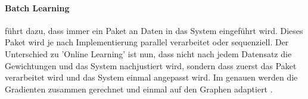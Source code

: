\paragraph{Batch Learning} %
führt dazu, dass immer ein Paket an Daten in das System eingeführt wird. 
Dieses Paket wird je nach Implementierung parallel verarbeitet oder sequenziell. 
Der Unterschied zu 'Online Learning' ist nun, dass nicht nach jedem Datensatz die Gewichtungen und das System nachjustiert wird, sondern dass zuerst das Paket verarbeitet wird und das System einmal angepasst wird. 
Im genauen werden die Gradienten zusammen gerechnet und einmal auf den Graphen adaptiert \cite{AI3}.






